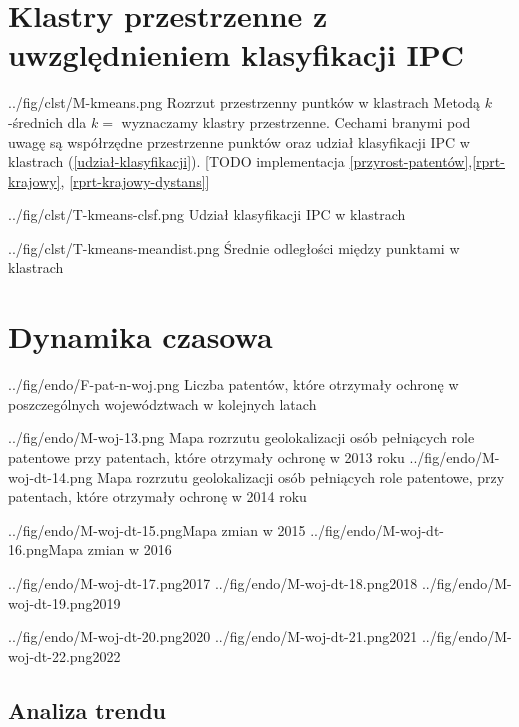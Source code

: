     \newpage\section
  {Klastry przestrzenne z uwzględnieniem klasyfikacji \ac{IPC}}

  \figside
{../fig/clst/M-kmeans.png}
{Rozrzut przestrzenny puntków w klastrach}
{
Metodą $k$-średnich dla $k=$ wyznaczamy klastry przestrzenne. 
Cechami branymi pod uwagę są współrzędne przestrzenne punktów oraz
udział klasyfikacji \ac{IPC} w klastrach (\cref{udział-klasyfikacji}). 
[TODO implementacja \cref{przyrost-patentów},\cref{rprt-krajowy},
\cref{rprt-krajowy-dystans}]
}

\tblside
{../fig/clst/T-kmeans-clsf.png}
{Udział klasyfikacji \ac{IPC} w klastrach}

\tblside
{../fig/clst/T-kmeans-meandist.png}
{Średnie odległości między punktami w klastrach}




    \newpage\section{Dynamika czasowa}

  \figside
{../fig/endo/F-pat-n-woj.png}
{ Liczba patentów, które otrzymały ochronę w poszczególnych województwach 
  w kolejnych latach }

  \figsides
{../fig/endo/M-woj-13.png}
{ Mapa rozrzutu geolokalizacji osób pełniących role patentowe 
  przy patentach, które otrzymały ochronę w 2013 roku}
{../fig/endo/M-woj-dt-14.png}
{ Mapa rozrzutu geolokalizacji osób pełniących role patentowe, 
  przy patentach, które otrzymały ochronę w 2014 roku}

  \newpage\figsides
{../fig/endo/M-woj-dt-15.png}{Mapa zmian w 2015}
{../fig/endo/M-woj-dt-16.png}{Mapa zmian w 2016}

  \figsidesTri
{../fig/endo/M-woj-dt-17.png}{2017}
{../fig/endo/M-woj-dt-18.png}{2018}
{../fig/endo/M-woj-dt-19.png}{2019}

  \figsidesTri
{../fig/endo/M-woj-dt-20.png}{2020}
{../fig/endo/M-woj-dt-21.png}{2021}
{../fig/endo/M-woj-dt-22.png}{2022}






  \newpage\subsection
{Analiza trendu}



